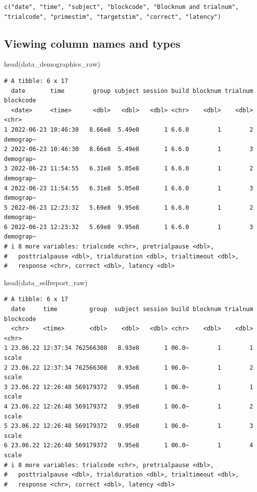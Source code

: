\documentclass[
  letterpaper,
  DIV=11,
  numbers=noendperiod]{scrreprt}
\newenvironment{Shaded}{\begin{snugshade}}{\end{snugshade}}
\newcommand{\FunctionTok}[1]{\textcolor[rgb]{0.28,0.35,0.67}{#1}}
\newcommand{\NormalTok}[1]{\textcolor[rgb]{0.00,0.23,0.31}{#1}}
\begin{document}
\begin{verbatim}
c("date", "time", "subject", "blockcode", "Blocknum and trialnum", 
"trialcode", "primestim", "targetstim", "correct", "latency")
\end{verbatim}

\subsection{Viewing column names and
types}\label{viewing-column-names-and-types}

\begin{Shaded}
\begin{Highlighting}[]
\FunctionTok{head}\NormalTok{(data\_demographics\_raw) }
\end{Highlighting}
\end{Shaded}

\begin{verbatim}
# A tibble: 6 x 17
  date       time        group subject session build blocknum trialnum blockcode
  <date>     <time>      <dbl>   <dbl>   <dbl> <chr>    <dbl>    <dbl> <chr>    
1 2022-06-23 10:46:30   8.66e8  5.49e8       1 6.6.0        1        2 demograp~
2 2022-06-23 10:46:30   8.66e8  5.49e8       1 6.6.0        1        3 demograp~
3 2022-06-23 11:54:55   6.31e8  5.05e8       1 6.6.0        1        2 demograp~
4 2022-06-23 11:54:55   6.31e8  5.05e8       1 6.6.0        1        3 demograp~
5 2022-06-23 12:23:32   5.69e8  9.95e8       1 6.6.0        1        2 demograp~
6 2022-06-23 12:23:32   5.69e8  9.95e8       1 6.6.0        1        3 demograp~
# i 8 more variables: trialcode <chr>, pretrialpause <dbl>,
#   posttrialpause <dbl>, trialduration <dbl>, trialtimeout <dbl>,
#   response <chr>, correct <dbl>, latency <dbl>
\end{verbatim}

\begin{Shaded}
\begin{Highlighting}[]
\FunctionTok{head}\NormalTok{(data\_selfreport\_raw)}
\end{Highlighting}
\end{Shaded}

\begin{verbatim}
# A tibble: 6 x 17
  date     time         group  subject session build blocknum trialnum blockcode
  <chr>    <time>       <dbl>    <dbl>   <dbl> <chr>    <dbl>    <dbl> <chr>    
1 23.06.22 12:37:34 762566308   8.93e8       1 06.0~        1        1 scale    
2 23.06.22 12:37:34 762566308   8.93e8       1 06.0~        1        2 scale    
3 23.06.22 12:26:48 569179372   9.95e8       1 06.0~        1        1 scale    
4 23.06.22 12:26:48 569179372   9.95e8       1 06.0~        1        2 scale    
5 23.06.22 12:26:48 569179372   9.95e8       1 06.0~        1        3 scale    
6 23.06.22 12:26:48 569179372   9.95e8       1 06.0~        1        4 scale    
# i 8 more variables: trialcode <chr>, pretrialpause <dbl>,
#   posttrialpause <dbl>, trialduration <dbl>, trialtimeout <dbl>,
#   response <chr>, correct <dbl>, latency <dbl>
\end{verbatim}
\end{document}
